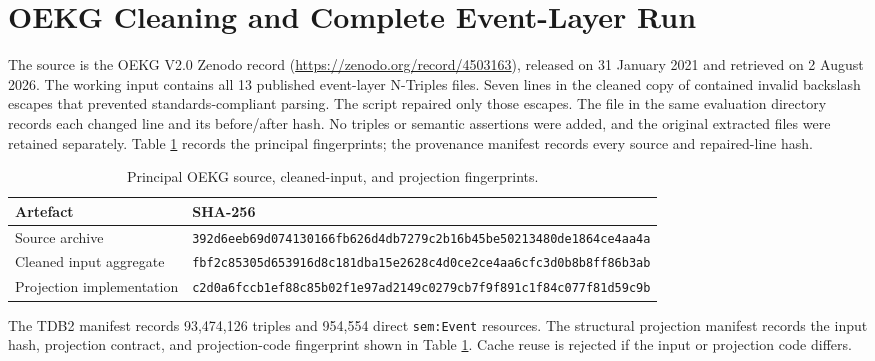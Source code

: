 \section{OEKG Cleaning and Complete Event-Layer Run}
\label{app:oekg_run_details}

The source is the OEKG V2.0 Zenodo record (\url{https://zenodo.org/record/4503163}), released on 31 January 2021 and retrieved on 2 August 2026. The working input contains all 13 published event-layer N-Triples files. Seven lines in the cleaned copy of  contained invalid backslash escapes that prevented standards-compliant parsing. The script  repaired only those escapes. The file  in the same evaluation directory records each changed line and its before/after hash. No triples or semantic assertions were added, and the original extracted files were retained separately. Table \ref{tab:oekg_hashes} records the principal fingerprints; the provenance manifest records every source and repaired-line hash.

\begin{table}[htbp]
\centering
\small
\caption{Principal OEKG source, cleaned-input, and projection fingerprints.}
\label{tab:oekg_hashes}
\begin{tabularx}{\textwidth}{>{\raggedright\arraybackslash}p{3.2cm}X}
\toprule
Artefact & SHA-256 \\
\midrule
Source archive & \texttt{392d6eeb69d074130166fb626d4db7279}\newline\texttt{c2b16b45be50213480de1864ce4aa4a} \\
Cleaned input aggregate & \texttt{fbf2c85305d653916d8c181dba15e262}\newline\texttt{8c4d0ce2ce4aa6cfc3d0b8b8ff86b3ab} \\
Projection implementation & \texttt{c2d0a6fccb1ef88c85b02f1e97ad2149}\newline\texttt{c0279cb7f9f891c1f84c077f81d59c9b} \\
\bottomrule
\end{tabularx}
\end{table}

The TDB2 manifest records 93,474,126 triples and 954,554 direct \texttt{sem:Event} resources. The structural projection manifest records the input hash, projection contract, and projection-code fingerprint shown in Table \ref{tab:oekg_hashes}. Cache reuse is rejected if the input or projection code differs.

